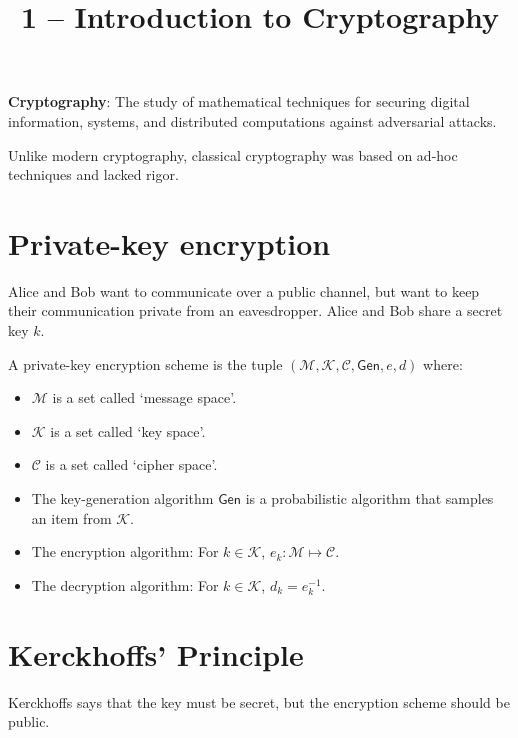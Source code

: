 

\title{1 -- Introduction to Cryptography}



\maketitle
\initMinimal{}

\textbf{Cryptography}: The study of mathematical techniques for securing
digital information, systems, and distributed computations against adversarial attacks.

Unlike modern cryptography, classical cryptography was based on ad-hoc techniques and lacked rigor.

\tableofcontents

\section{Private-key encryption}

Alice and Bob want to communicate over a public channel,
but want to keep their communication private from an eavesdropper.
Alice and Bob share a secret key $k$.

A private-key encryption scheme is the tuple
$(\mathcal{M}, \mathcal{K}, \mathcal{C}, \mathsf{Gen}, e, d)$ where:

\begin{itemize}
\item $\mathcal{M}$ is a set called `message space'.
\item $\mathcal{K}$ is a set called `key space'.
\item $\mathcal{C}$ is a set called `cipher space'.
\item The key-generation algorithm $\mathsf{Gen}$ is a probabilistic algorithm
that samples an item from $\mathcal{K}$.
\item The encryption algorithm: For $k \in \mathcal{K}$,
  $e_k: \mathcal{M} \mapsto \mathcal{C}$.
\item The decryption algorithm: For $k \in \mathcal{K}$, $d_k = e_k^{-1}$.
\end{itemize}


\section{Kerckhoffs' Principle}

Kerckhoffs says that the key must be secret, but the encryption scheme should be public.

